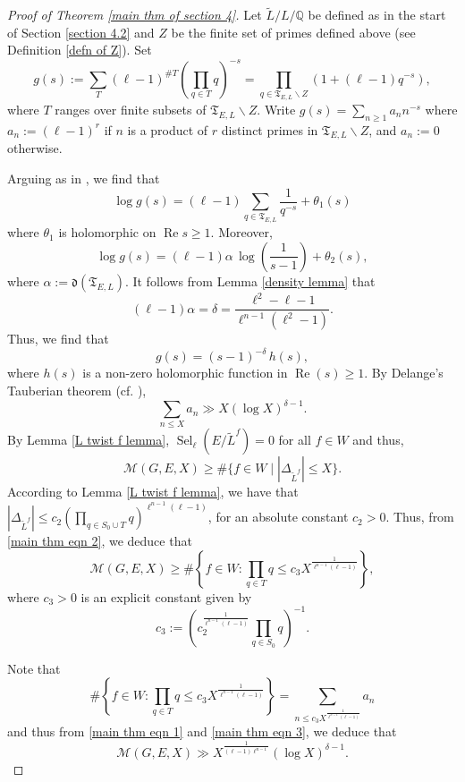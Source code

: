 \documentclass[11pt,reqno]{amsart}
\newcommand{\Q}{\mathbb{Q}}
\newcommand{\op}[1]{\operatorname{#1}}
\numberwithin{equation}{section}
\begin{document}
\begin{proof}[Proof of Theorem \ref{main thm of section 4}]
 Let $\widetilde{L}/L/\Q$ be defined as in the start of Section \ref{section 4.2} and $Z$ be the finite set of primes defined above (see Definition \ref{defn of Z}). Set
 \[g(s):=\sum_{T} (\ell-1)^{\# T}\left(\prod_{q\in T} q\right)^{-s}=\prod_{q\in \mathfrak{T}_{E,L}\backslash Z} \left(1+(\ell-1)q^{-s}\right),\]
 where $T$ ranges over finite subsets of $\mathfrak{T}_{E,L}\backslash Z$. Write $g(s)=\sum_{n\geq 1} a_n n^{-s}$ where $a_n:=(\ell-1)^r$ if $n$ is a product of $r$ distinct primes in $\mathfrak{T}_{E, L}\backslash Z$, and $a_n:=0$ otherwise. 
 
 \par Arguing as in \cite[Theorem 2.4, p.5]{serredivisibilite}, we find that
\[\log g(s)=(\ell-1)\sum_{q\in \mathfrak{T}_{E,L}} \frac{1}{q^{-s}}+\theta_1(s)\] where $\theta_1$ is holomorphic on $\op{Re}s \geq 1$. Moreover, \[\log g(s) = (\ell-1) \alpha \, \log\left(\frac{1}{s-1}\right)+\theta_2(s), \]
where $\alpha:=\mathfrak{d}(\mathfrak{T}_{E,L})$. It follows from Lemma \ref{density lemma} that 
\[(\ell-1)\alpha=\delta=\frac{\ell^2 - \ell - 1}{\ell^{n-1}(\ell^2-1)}.\]
Thus, we find that 
\[g(s)=(s-1)^{- \delta} \, h(s),\] where $h(s)$ is a non-zero holomorphic function in $\op{Re}(s)\geq 1$. By Delange's Tauberian theorem (cf. \cite[Theorem 7.28]{Tenenbaum}), 
\begin{equation}\label{main thm eqn 1}\sum_{n\leq X} a_n \gg  X(\log X)^{\delta-1}.\end{equation}
By Lemma \ref{L twist f lemma}, $\op{Sel}_\ell(E/\widetilde{L}^f)=0$ for all $f\in W$ and thus,\begin{equation}\label{main thm eqn 2}
     \mathcal{M}(G, E, X)\geq \#\{f\in W\mid |\Delta_{\widetilde{L}^f}|\leq X\}.
 \end{equation}
 \noindent According to Lemma \ref{L twist f lemma}, we have that $ |\Delta_{\widetilde{L}^f}|\leq c_2\left(\prod_{q\in S_0\cup T} q\right)^{\ell^{n-1}(\ell-1)}$, for an absolute constant $c_2>0$. Thus, from \eqref{main thm eqn 2}, we deduce that
 \begin{equation}\label{main thm eqn 3}
     \mathcal{M}(G, E, X)\geq \#\left\{f\in W: \prod_{q\in T} q\leq c_3 X^{\frac{1}{\ell^{n-1}(\ell-1)}}\right\},
 \end{equation}
 where $c_3>0$ is an explicit constant given by 
\[c_3:=\left(c_2^{\frac{1}{\ell^{n-1}(\ell-1)}} \prod_{q\in S_0} q\right)^{-1}.\]

Note that 
\begin{equation}\#\left\{f\in W: \prod_{q\in T} q\leq c_3 X^{\frac{1}{\ell^{n-1}(\ell-1)}}\right\}= \sum_{n\leq c_3 X^{\frac{1}{\ell^{n-1}(\ell-1)}}} a_n\end{equation}
and thus from \eqref{main thm eqn 1} and \eqref{main thm eqn 3}, we deduce that 
 \[\mathcal{M}(G, E, X)\gg X^{\frac{1}{(\ell-1)\ell^{n-1}}}(\log X)^{\delta-1}.\]
 \end{proof}
    


\end{document}
